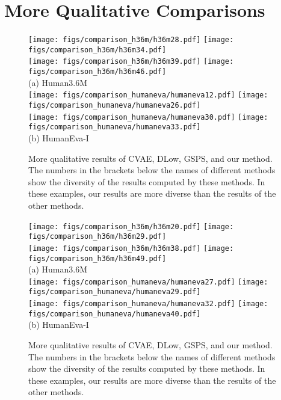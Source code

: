 \documentclass[sigconf,screen,nonacm]{acmart}
\begin{document}
	


	
	\section{More Qualitative Comparisons}
	
	\begin{figure*}[!t]
		\centering
		\texttt{[image: figs/comparison\_h36m/h36m28.pdf]}
\texttt{[image: figs/comparison\_h36m/h36m34.pdf]}\\
\texttt{[image: figs/comparison\_h36m/h36m39.pdf]}
\texttt{[image: figs/comparison\_h36m/h36m46.pdf]} \\
(a) Human3.6M \\
		\texttt{[image: figs/comparison\_humaneva/humaneva12.pdf]}
		\texttt{[image: figs/comparison\_humaneva/humaneva26.pdf]} \\
		\texttt{[image: figs/comparison\_humaneva/humaneva30.pdf]}
		\texttt{[image: figs/comparison\_humaneva/humaneva33.pdf]}\\ 
		(b) HumanEva-I \\
		\caption{More qualitative results of CVAE, DLow, GSPS, and our method. The numbers in the brackets below the names of different methods show the diversity of the results computed by these methods. In these examples, our results are more diverse than the results of the other methods.}
		\label{fig:more-qual_1}
	\end{figure*}
	
	
	\begin{figure*}[!t]
		\centering
		\texttt{[image: figs/comparison\_h36m/h36m20.pdf]}
\texttt{[image: figs/comparison\_h36m/h36m29.pdf]}\\
\texttt{[image: figs/comparison\_h36m/h36m38.pdf]}
\texttt{[image: figs/comparison\_h36m/h36m49.pdf]} \\
(a) Human3.6M \\
		\texttt{[image: figs/comparison\_humaneva/humaneva27.pdf]}
		\texttt{[image: figs/comparison\_humaneva/humaneva29.pdf]} \\
		\texttt{[image: figs/comparison\_humaneva/humaneva32.pdf]}
		\texttt{[image: figs/comparison\_humaneva/humaneva40.pdf]}\\ 
		(b) HumanEva-I \\
		\caption{More qualitative results of CVAE, DLow, GSPS, and our method. The numbers in the brackets below the names of different methods show the diversity of the results computed by these methods. In these examples, our results are more diverse than the results of the other methods.}
		\label{fig:more-qual_2}
	\end{figure*}
	
\end{document}
